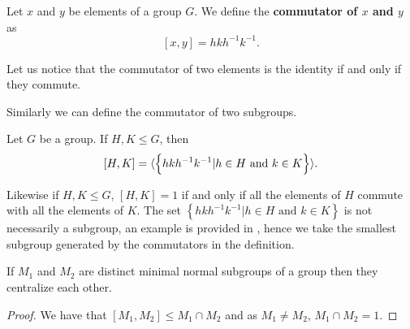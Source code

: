 \begin{definition}
    Let $x$ and $y$ be elements of a group $G$. We define the \textbf{commutator of $x$ and $y$} as 
    $$
    [x,y] = hkh^{-1}k^{-1}.
    $$
\end{definition}

Let us notice that the commutator of two elements is the identity if and only if they commute.

Similarly we can define the commutator of two subgroups.

\begin{definition}
    \label{S1:groupcommutator}
    Let $G$ be a group. If $H, K \le G$, then
    $$
    [H,K] = \langle \left\{ hkh^{-1}k^{-1} | h \in H \text{ and } k \in K \right\} \rangle.
    $$ 
\end{definition}

Likewise if $H,K \le G$, $[H,K] = 1$ if and only if all the elements of $H$ commute with all the elements of $K$.
The set $\left\{ hkh^{-1}k^{-1} | h \in H \text{ and } k \in K \right\}$ is not necessarily a subgroup, an example is provided in \cite{CassidyPCANACAE}, hence we take the smallest subgroup generated by the commutators in the definition.

\begin{theorem}
    \label{mnsubsc}
    If $M_1$ and $M_2$ are distinct minimal normal subgroups of a group then they centralize each other.
\end{theorem}

\begin{proof}
    We have that $[ M_1, M_2] \le M_1 \cap M_2$ and as $M_1 \ne M_2$, $M_1 \cap M_2 = 1$.
\end{proof}